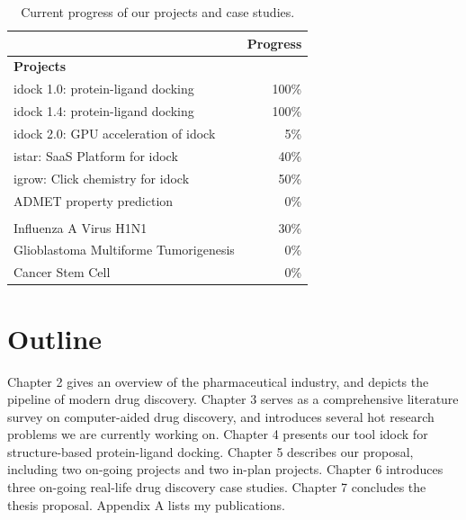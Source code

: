\begin{table}
\centering
\begin{tabular*}
{\linewidth}
{@{\extracolsep{\fill}}lr}
\toprule
 & Progress \\
\midrule
\multicolumn{2}{l}{\textbf{Projects}}\\
idock 1.0: protein-ligand docking & 100\% \\
idock 1.4: protein-ligand docking & 100\% \\
idock 2.0: GPU acceleration of idock & 5\% \\
istar: SaaS Platform for idock & 40\% \\
igrow: Click chemistry for idock & 50\% \\
ADMET property prediction & 0\% \\
\noalign{\smallskip\smallskip}
\multicolumn{2}{l}{\textbf{Case studies}}\\
Influenza A Virus H1N1 & 30\% \\
Glioblastoma Multiforme Tumorigenesis & 0\% \\
Cancer Stem Cell & 0\% \\
\bottomrule
\end{tabular*}
\caption{Current progress of our projects and case studies.}
\label{Introduction:Progress}
\end{table}

\section{Outline}

Chapter 2 gives an overview of the pharmaceutical industry, and depicts the pipeline of modern drug discovery. Chapter 3 serves as a comprehensive literature survey on computer-aided drug discovery, and introduces several hot research problems we are currently working on. Chapter 4 presents our tool idock for structure-based protein-ligand docking. Chapter 5 describes our proposal, including two on-going projects and two in-plan projects. Chapter 6 introduces three on-going real-life drug discovery case studies. Chapter 7 concludes the thesis proposal. Appendix A lists my publications.

\chapterend